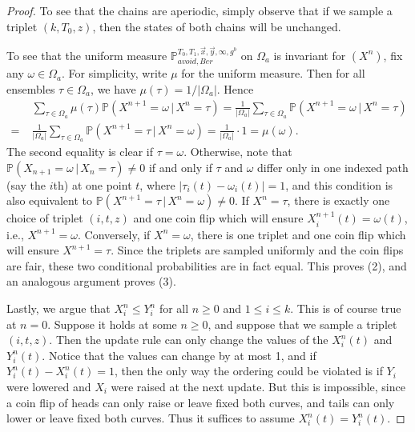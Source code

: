 \begin{proof}
	To see that the chains are aperiodic, simply observe that if we sample a triplet $(k,T_0,z)$, then the states of both chains will be unchanged.
	
	To see that the uniform measure $\mathbb{P}_{avoid,Ber}^{T_0,T_1,\vec{x},\vec{y},\infty,g^b}$ on $\Omega_a$ is invariant for $(X^n)$, fix any $\omega\in\Omega_a$. For simplicity, write $\mu$ for the uniform measure. Then for all ensembles $\tau\in\Omega_a$, we have $\mu(\tau) = 1/|\Omega_a|$. Hence
	\begin{align*}
	& \sum_{\tau\in\Omega_a} \mu(\tau)\mathbb{P}(X^{n+1} = \omega\,|\,X^n = \tau) = \frac{1}{|\Omega_a|}\sum_{\tau\in\Omega_a} \mathbb{P}(X^{n+1} = \omega\,|\,X^n = \tau)\\
	= \; & \frac{1}{|\Omega_a|}\sum_{\tau\in\Omega_a} \mathbb{P}(X^{n+1} = \tau\,|\,X^n = \omega) = \frac{1}{|\Omega_a|}\cdot 1 = \mu(\omega).
	\end{align*}
	The second equality is clear if $\tau=\omega$. Otherwise, note that $\mathbb{P}(X_{n+1} = \omega\,|\,X_n = \tau) \neq 0$ if and only if $\tau$ and $\omega$ differ only in one indexed path (say the $i$th) at one point $t$, where $|\tau_i(t)-\omega_i(t)|=1$, and this condition is also equivalent to $\mathbb{P}(X^{n+1} = \tau\,|\,X^n = \omega) \neq 0$. If $X^n=\tau$, there is exactly one choice of triplet $(i,t,z)$ and one coin flip which will ensure $X^{n+1}_i(t)=\omega(t)$, i.e., $X^{n+1}=\omega$. Conversely, if $X^n=\omega$, there is one triplet and one coin flip which will ensure $X^{n+1}=\tau$. Since the triplets are sampled uniformly and the coin flips are fair, these two conditional probabilities are in fact equal. This proves (2), and an analogous argument proves (3).
	
	Lastly, we argue that $X^n_i\leq Y^n_i$ for all $n\geq 0$ and $1\leq i\leq k$. This is of course true at $n=0$. Suppose it holds at some $n\geq 0$, and suppose that we sample a triplet $(i,t,z)$. Then the update rule can only change the values of the $X_i^n(t)$ and $Y_i^n(t)$. Notice that the values can change by at most 1, and if $Y^n_i(t) - X^n_i(t) = 1$, then the only way the ordering could be violated is if $Y_i$ were lowered and $X_i$ were raised at the next update. But this is impossible, since a coin flip of heads can only raise or leave fixed both curves, and tails can only lower or leave fixed both curves. Thus it suffices to assume $X^n_i(t) = Y^n_i(t)$.
	

\end{proof}
